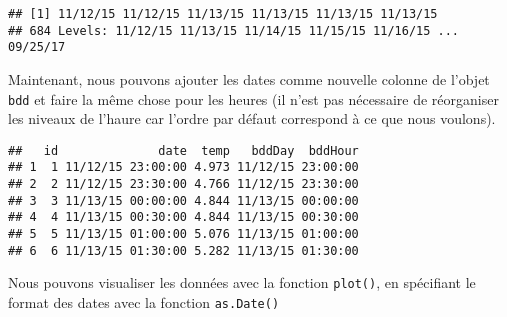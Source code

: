\documentclass[]{book}
\newenvironment{Shaded}{\begin{snugshade}}{\end{snugshade}}
\newcommand{\KeywordTok}[1]{\textcolor[rgb]{0.13,0.29,0.53}{\textbf{#1}}}
\newcommand{\DataTypeTok}[1]{\textcolor[rgb]{0.13,0.29,0.53}{#1}}
\newcommand{\DecValTok}[1]{\textcolor[rgb]{0.00,0.00,0.81}{#1}}
\newcommand{\StringTok}[1]{\textcolor[rgb]{0.31,0.60,0.02}{#1}}
\newcommand{\OperatorTok}[1]{\textcolor[rgb]{0.81,0.36,0.00}{\textbf{#1}}}
\newcommand{\NormalTok}[1]{#1}
\theoremstyle{definition}
\theoremstyle{definition}
\theoremstyle{definition}
\theoremstyle{remark}
\begin{document}
\begin{verbatim}
## [1] 11/12/15 11/12/15 11/13/15 11/13/15 11/13/15 11/13/15
## 684 Levels: 11/12/15 11/13/15 11/14/15 11/15/15 11/16/15 ... 09/25/17
\end{verbatim}

Maintenant, nous pouvons ajouter les dates comme nouvelle colonne de
l'objet \texttt{bdd} et faire la même chose pour les heures (il n'est
pas nécessaire de réorganiser les niveaux de l'haure car l'ordre par
défaut correspond à ce que nous voulons).

\begin{Shaded}
\begin{Highlighting}[]
\NormalTok{bdd}\OperatorTok{$}\NormalTok{bddDay <-}\StringTok{ }\NormalTok{bddDay}
\NormalTok{bdd}\OperatorTok{$}\NormalTok{bddHour <-}\StringTok{ }\KeywordTok{as.factor}\NormalTok{(}\KeywordTok{sapply}\NormalTok{(}\KeywordTok{strsplit}\NormalTok{(bdd[, }\DecValTok{2}\NormalTok{], }\DataTypeTok{split =} \StringTok{" "}\NormalTok{), }\StringTok{"[["}\NormalTok{, }\DecValTok{2}\NormalTok{))}
\KeywordTok{head}\NormalTok{(bdd)}
\end{Highlighting}
\end{Shaded}

\begin{verbatim}
##   id              date  temp   bddDay  bddHour
## 1  1 11/12/15 23:00:00 4.973 11/12/15 23:00:00
## 2  2 11/12/15 23:30:00 4.766 11/12/15 23:30:00
## 3  3 11/13/15 00:00:00 4.844 11/13/15 00:00:00
## 4  4 11/13/15 00:30:00 4.844 11/13/15 00:30:00
## 5  5 11/13/15 01:00:00 5.076 11/13/15 01:00:00
## 6  6 11/13/15 01:30:00 5.282 11/13/15 01:30:00
\end{verbatim}

Nous pouvons visualiser les données avec la fonction \texttt{plot()}, en
spécifiant le format des dates avec la fonction \texttt{as.Date()}

\begin{Shaded}
\end{Shaded}
\end{document}
